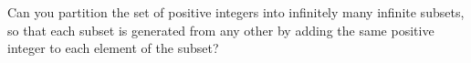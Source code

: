 Can you partition the set of positive integers into infinitely many infinite subsets, so that each subset is generated from any other by adding the same positive integer to each element of the subset?
